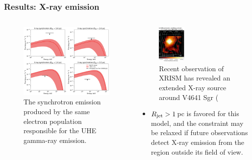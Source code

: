 \documentclass[10pt,aspectratio=169,mathserif]{beamer}
\begin{document}
\begin{frame}
\frametitle{Results: X-ray emission}
\begin{columns}[T] %
    \begin{column}{0.5\textwidth} 
      \begin{figure}
        \includegraphics[width=\textwidth]{SYN_all_HESS_flat_q=1.6666666666666667.pdf}
        \caption{The synchrotron emission produced by the same electron population responsible for the UHE gamma-ray emission.}
        \label{fig:confine}
      \end{figure}
    \end{column}

    \begin{column}{0.5\textwidth}
    \begin{figure}
        \includegraphics[width=0.35\textwidth]{XRISM.png}
        \caption{Recent observation of XRISM has revealed an extended X-ray source around V4641 Sgr (\citep{suzuki2025detection}}
        \label{fig:confine}
      \end{figure}
    \begin{itemize}
        \item $R_{\rm jet}>1\,$pc is favored for this model, and the constraint may be relaxed if future observations detect X-ray emission from the region outside its field of view.
    \end{itemize}
    \end{column}
\end{columns}
\end{frame}
\end{document}
